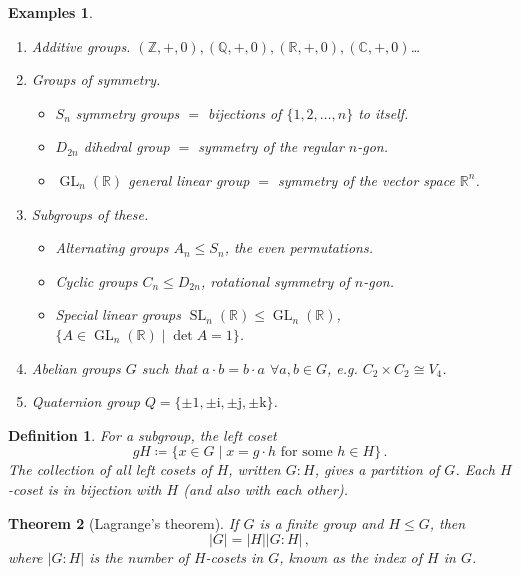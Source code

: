 \documentclass{article}
\theoremstyle{plain}\theoremheaderfont{\normalfont\itshape}\theorembodyfont{\rmfamily}\theoremseparator{.}\newtheorem*{rem}{Remark}\newtheorem*{ex}{Example}\newtheorem*{proof}{Proof}\newtheorem*{altp}{Alternative proof}\newtheorem*{nonex}{Non-Example}
\theoremstyle{plain}\theoremheaderfont{\normalfont\bfseries}\theorembodyfont{\rmfamily}\theoremseparator{.}\newtheorem{thm}{Theorem}[section]\newtheorem{lem}[thm]{Lemma}\newtheorem{prop}[thm]{Proposition}\newtheorem*{cor}{Corollary}\newtheorem{defn}[thm]{Definition}\newtheorem{clm}[thm]{Claim}\newtheorem{clminproof}{Claim}\newtheorem*{notn}{Notation}\newtheorem*{exer}{Exercise}\newtheorem*{lemnn}{Lemma}
\theoremstyle{break}\theoremheaderfont{\normalfont\itshape}\theorembodyfont{\rmfamily}\theoremseparator{.\medskip}\newtheorem*{proofskip}{Proof}\newtheorem*{exs}{Examples}\newtheorem*{rems}{Remarks}\newtheorem*{obs}{Observations}
\theoremstyle{break}\theoremheaderfont{\normalfont\bfseries}\theorembodyfont{\rmfamily}\theoremseparator{.\medskip}\newtheorem{lemskip}[thm]{Lemma}\newtheorem{defnskip}[thm]{Definition}\newtheorem{propskip}[thm]{Proposition}\newtheorem{thmskip}[thm]{Theorem}
\numberwithin{equation}{section}
\newcommand{\ii}{\mathrm{i}}
\newcommand{\abs}[1]{\left|#1\right|}
\DeclareMathOperator{\GL}{GL}
\DeclareMathOperator{\SL}{SL}
\newcommand{\ZZ}{\mathbb{Z}}
\newcommand{\QQ}{\mathbb{Q}}
\newcommand{\RR}{\mathbb{R}}
\newcommand{\CC}{\mathbb{C}}
\begin{document}
    \begin{exs}
        \begin{enumerate}[topsep=0pt,label=(\roman*)]
            \item Additive groups. \((\ZZ,+,0),(\QQ,+,0),(\RR,+,0),(\CC,+,0)\)\dots
            \item Groups of symmetry.
            \begin{itemize}
                \item \(S_n\) symmetry groups \(=\) bijections of \(\{1,2,\dots,n\}\) to itself.
                \item \(D_{2n}\) dihedral group \(=\) symmetry of the regular \(n\)-gon.
                \item \(\GL_n(\RR)\) general linear group \(=\) symmetry of the vector space \(\RR^n\).
            \end{itemize}
            \item Subgroups of these.
            \begin{itemize}
                \item Alternating groups \(A_n\le S_n\), the even permutations.
                \item Cyclic groups \(C_n\le D_{2n}\), rotational symmetry of \(n\)-gon.
                \item Special linear groups \(\SL_n(\RR)\le\GL_n(\RR)\), \(\{A\in\GL_n(\RR)\mid\det{A}=1\}\).
            \end{itemize}
            \item Abelian groups \(G\) such that \(a\cdot b=b\cdot a\) \(\forall a,b\in G\), e.g. \(C_2\times C_2\cong V_4\).
            \item Quaternion group \(Q=\{\pm 1,\pm \ii,\pm \mathrm{j},\pm \mathrm{k}\}\).
        \end{enumerate}
    \end{exs}
    \begin{defn}
        For a subgroup, the \textit{left coset}
        \[gH\coloneqq\{x\in G\mid x=g\cdot h\text{ for some }h\in H\}\,.\]
        The collection of all left cosets of \(H\), written \(G:H\), gives a partition of \(G\). Each \(H\)-coset is in bijection with \(H\) (and also with each other).
    \end{defn}
    \begin{thm}[Lagrange's theorem]
        If \(G\) is a finite group and \(H\le G\), then
        \[\abs{G}=\abs{H}\abs{G:H}\,,\]
        where \(\abs{G:H}\) is the number of \(H\)-cosets in \(G\), known as the \textit{index} of \(H\) in \(G\).
    \end{thm}
\end{document}
